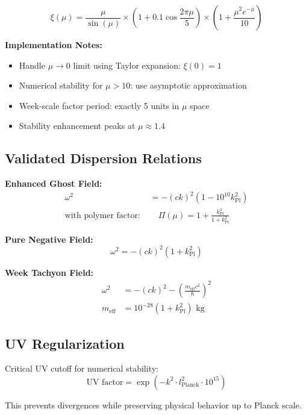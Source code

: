 \documentclass[11pt]{article}
\begin{document}
\begin{equation}
\xi(\mu) = \frac{\mu}{\sin(\mu)} \times \left(1 + 0.1\cos\frac{2\pi\mu}{5}\right) \times \left(1 + \frac{\mu^2 e^{-\mu}}{10}\right)
\end{equation}

\textbf{Implementation Notes:}
\begin{itemize}
    \item Handle $\mu \to 0$ limit using Taylor expansion: $\xi(0) = 1$
    \item Numerical stability for $\mu > 10$: use asymptotic approximation
    \item Week-scale factor period: exactly 5 units in $\mu$ space
    \item Stability enhancement peaks at $\mu \approx 1.4$
\end{itemize}

\subsection{Validated Dispersion Relations}

\textbf{Enhanced Ghost Field:}
\begin{align}
\omega^2 &= -(ck)^2\left(1 - 10^{10} k_{\text{Pl}}^2\right) \\
\text{with polymer factor: } &\quad \Pi(\mu) = 1 + \frac{k_{\text{Pl}}^4}{1 + k_{\text{Pl}}^2}
\end{align}

\textbf{Pure Negative Field:}
\begin{equation}
\omega^2 = -(ck)^2(1 + k_{\text{Pl}}^2)
\end{equation}

\textbf{Week Tachyon Field:}
\begin{align}
\omega^2 &= -(ck)^2 - \left(\frac{m_{\text{eff}}c^2}{\hbar}\right)^2 \\
m_{\text{eff}} &= 10^{-28}(1 + k_{\text{Pl}}^2) \text{ kg}
\end{align}

\subsection{UV Regularization}

Critical UV cutoff for numerical stability:
\begin{equation}
\text{UV factor} = \exp(-k^2 \cdot l_{\text{Planck}}^2 \cdot 10^{15})
\end{equation}

This prevents divergences while preserving physical behavior up to Planck scale.
\end{document}
